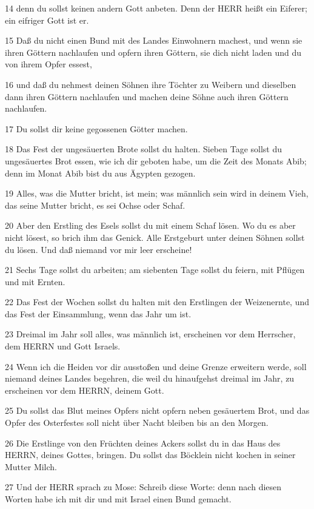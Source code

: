 \par 14 denn du sollst keinen andern Gott anbeten. Denn der HERR heißt ein Eiferer; ein eifriger Gott ist er.
\par 15 Daß du nicht einen Bund mit des Landes Einwohnern machest, und wenn sie ihren Göttern nachlaufen und opfern ihren Göttern, sie dich nicht laden und du von ihrem Opfer essest,
\par 16 und daß du nehmest deinen Söhnen ihre Töchter zu Weibern und dieselben dann ihren Göttern nachlaufen und machen deine Söhne auch ihren Göttern nachlaufen.
\par 17 Du sollst dir keine gegossenen Götter machen.
\par 18 Das Fest der ungesäuerten Brote sollst du halten. Sieben Tage sollst du ungesäuertes Brot essen, wie ich dir geboten habe, um die Zeit des Monats Abib; denn im Monat Abib bist du aus Ägypten gezogen.
\par 19 Alles, was die Mutter bricht, ist mein; was männlich sein wird in deinem Vieh, das seine Mutter bricht, es sei Ochse oder Schaf.
\par 20 Aber den Erstling des Esels sollst du mit einem Schaf lösen. Wo du es aber nicht lösest, so brich ihm das Genick. Alle Erstgeburt unter deinen Söhnen sollst du lösen. Und daß niemand vor mir leer erscheine!
\par 21 Sechs Tage sollst du arbeiten; am siebenten Tage sollst du feiern, mit Pflügen und mit Ernten.
\par 22 Das Fest der Wochen sollst du halten mit den Erstlingen der Weizenernte, und das Fest der Einsammlung, wenn das Jahr um ist.
\par 23 Dreimal im Jahr soll alles, was männlich ist, erscheinen vor dem Herrscher, dem HERRN und Gott Israels.
\par 24 Wenn ich die Heiden vor dir ausstoßen und deine Grenze erweitern werde, soll niemand deines Landes begehren, die weil du hinaufgehst dreimal im Jahr, zu erscheinen vor dem HERRN, deinem Gott.
\par 25 Du sollst das Blut meines Opfers nicht opfern neben gesäuertem Brot, und das Opfer des Osterfestes soll nicht über Nacht bleiben bis an den Morgen.
\par 26 Die Erstlinge von den Früchten deines Ackers sollst du in das Haus des HERRN, deines Gottes, bringen. Du sollst das Böcklein nicht kochen in seiner Mutter Milch.
\par 27 Und der HERR sprach zu Mose: Schreib diese Worte: denn nach diesen Worten habe ich mit dir und mit Israel einen Bund gemacht.
